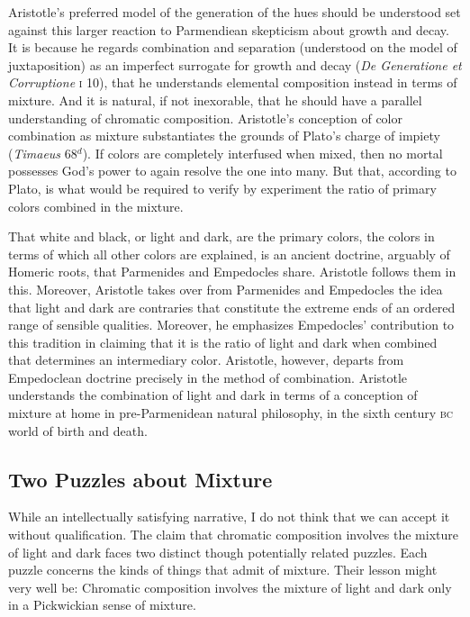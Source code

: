 Aristotle's preferred model of the generation of the hues should be understood set against this larger reaction to Parmendiean skepticism about growth and decay. It is because he regards combination and separation (understood on the model of juxtaposition) as an imperfect surrogate for growth and decay (\emph{De Generatione et Corruptione} \textsc{i} 10), that he understands elemental composition instead in terms of mixture. And it is natural, if not inexorable, that he should have a parallel understanding of chromatic composition. Aristotle's conception of color combination as mixture substantiates the grounds of Plato's charge of impiety (\emph{Timaeus} 68\( ^{d} \)). If colors are completely interfused when mixed, then no mortal possesses God's power to again resolve the one into many. But that, according to Plato, is what would be required to verify by experiment the ratio of primary colors combined in the mixture.

That white and black, or light and dark, are the primary colors, the colors in terms of which all other colors are explained, is an ancient doctrine, arguably of Homeric roots, that Parmenides and Empedocles share. Aristotle follows them in this. Moreover, Aristotle takes over from Parmenides and Empedocles the idea that light and dark are contraries that constitute the extreme ends of an ordered range of sensible qualities. Moreover, he emphasizes Empedocles' contribution to this tradition in claiming that it is the ratio of light and dark when combined that determines an intermediary color. Aristotle, however, departs from Empedoclean doctrine precisely in the method of combination. Aristotle understands the combination of light and dark in terms of a conception of mixture at home in pre-Parmenidean natural philosophy, in the sixth century \textsc{bc} world of birth and death. 


\subsection{Two Puzzles about Mixture} %
\label{sub:two_puzzles_about_mixture}

While an intellectually satisfying narrative, I do not think that we can accept it without qualification. The claim that chromatic composition involves the mixture of light and dark faces two distinct though potentially related puzzles. Each puzzle concerns the kinds of things that admit of mixture. Their lesson might very well be: Chromatic composition involves the mixture of light and dark only in a Pickwickian sense of mixture.


